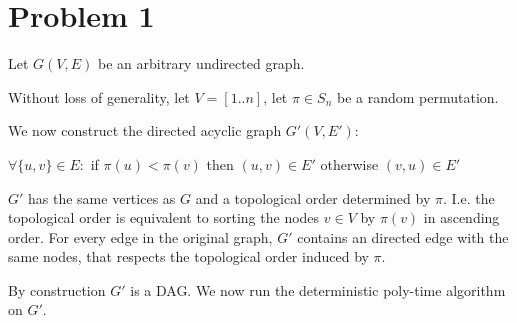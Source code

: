 \section*{Problem 1}

Let $G(V,E)$ be an arbitrary undirected graph.

Without loss of generality, let $V = [1..n]$, let $\pi \in S_n$ be a random permutation.

We now construct the directed acyclic graph $G'(V, E')$:

$\forall \{u, v\} \in E: $ if $\pi(u) < \pi(v)$ then $(u, v) \in E'$ otherwise $(v, u) \in E'$

$G'$ has the same vertices as $G$ and a topological order determined by $\pi$. I.e. the topological order is equivalent to sorting the nodes $v \in V$ by $\pi(v)$ in ascending order. For every edge in the original graph, $G'$ contains an directed edge with the same nodes, that respects the topological order induced by $\pi$.

By construction $G'$ is a DAG. We now run the deterministic poly-time algorithm on $G'$.


